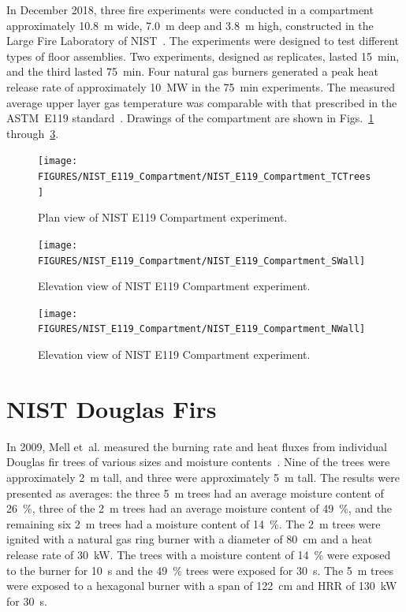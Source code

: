 In December 2018, three fire experiments were conducted in a compartment approximately 10.8~m wide, 7.0~m deep and 3.8~m high, constructed in the Large Fire Laboratory of NIST~\cite{Ana:TN2070}. The experiments were designed to test different types of floor assemblies. Two experiments, designed as replicates, lasted 15~min, and the third lasted 75~min. Four natural gas burners generated a peak heat release rate of approximately 10~MW in the 75~min experiments. The measured average upper layer gas temperature was comparable with that prescribed in the ASTM~E119 standard~\cite{E119}. Drawings of the compartment are shown in Figs.~\ref{NIST_E119_Compartment_Drawing_1} through~\ref{NIST_E119_Compartment_Drawing_3}.

\begin{figure}
\texttt{[image: FIGURES/NIST\_E119\_Compartment/NIST\_E119\_Compartment\_TCTrees]}
\caption[Plan view of NIST E119 Compartment experiment]{Plan view of NIST E119 Compartment experiment.}
\label{NIST_E119_Compartment_Drawing_1}
\end{figure}

\begin{figure}
\texttt{[image: FIGURES/NIST\_E119\_Compartment/NIST\_E119\_Compartment\_SWall]}
\caption[Elevation view of NIST E119 Compartment experiment]{Elevation view of NIST E119 Compartment experiment.}
\label{NIST_E119_Compartment_Drawing_2}
\end{figure}

\begin{figure}
\texttt{[image: FIGURES/NIST\_E119\_Compartment/NIST\_E119\_Compartment\_NWall]}
\caption[Elevation view of NIST E119 Compartment experiment]{Elevation view of NIST E119 Compartment experiment.}
\label{NIST_E119_Compartment_Drawing_3}
\end{figure}

\FloatBarrier

\section{NIST Douglas Firs}
\label{NIST_Douglas_Firs_Description}

In 2009, Mell et~al. measured the burning rate and heat fluxes from individual Douglas fir trees of various sizes and moisture contents~\cite{Mell:2009}. Nine of the trees were approximately 2~m tall, and three were approximately 5~m tall. The results were presented as averages: the three 5~m trees had an average moisture content of 26~\%, three of the 2~m trees had an average moisture content of 49~\%, and the remaining six 2~m trees had a moisture content of 14~\%. The 2~m trees were ignited with a natural gas ring burner with a diameter of 80~cm and a heat release rate of 30~kW. The trees with a moisture content of 14~\% were exposed to the burner for 10~s and the 49~\% trees were exposed for 30~s. The 5~m trees were exposed to a hexagonal burner with a span of 122~cm and HRR of 130~kW for 30~s.

